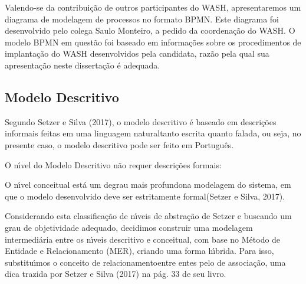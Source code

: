 \documentclass[
12pt,		%
openright,	%
twoside,  %
a4paper,			%
chapter=TITLE,		%
english,			%
french,				%
spanish,			%
brazil				%
]{USPSC-classe/USPSC}
\begin{document}
Valendo-se da contribui\c{c}\~ao de outros participantes do WASH, apresentaremos um diagrama de modelagem de processos no formato BPMN. Este diagrama foi desenvolvido pelo colega Saulo Monteiro, a pedido da coordena\c{c}\~ao do WASH. O modelo BPMN em quest\~ao foi baseado em informa\c{c}\~oes sobre os procedimentos de implanta\c{c}\~ao do WASH desenvolvidos pela candidata, raz\~ao pela qual sua apresenta\c{c}\~ao neste disserta\c{c}\~ao \'e adequada.


\subsection[Modelo Descritivo]{Modelo Descritivo}\label{Modelo Descritivo}
Segundo Setzer e Silva (2017), o modelo descritivo \'e baseado em \textquotedbl descri\c{c}\~oes informais feitas em uma linguagem natural\textquotedbl  tanto escrita quanto falada, ou seja, no presente caso, o modelo descritivo pode ser feito em Portugu\^es.


O n\'{\i}vel do Modelo Descritivo n\~ao requer descri\c{c}\~oes formais:



\noindent\begin{center}\mbox{\centering{}}\end{center}


O n\'{\i}vel conceitual est\'a \textquotedbl um degrau mais profundo\textquotedbl  na modelagem do sistema, em que \textquotedbl o modelo desenvolvido deve ser estritamente formal\textquotedbl  (Setzer e Silva, 2017).


Considerando esta classifica\c{c}\~ao de n\'{\i}veis de abstra\c{c}\~ao de Setzer e buscando um grau de objetividade adequado, decidimos construir uma modelagem intermedi\'aria entre os n\'{\i}veis descritivo e conceitual, com base no M\'etodo de Entidade e Relacionamento (MER), criando uma forma h\'{\i}brida. Para isso, substitu\'{\i}mos o conceito de \textquotedbl relacionamento\textquotedbl  entre entes pelo de \textquotedbl associa\c{c}\~ao\textquotedbl , uma dica trazida por  Setzer e Silva (2017) na p\'ag. 33 de seu livro.
\end{document}
